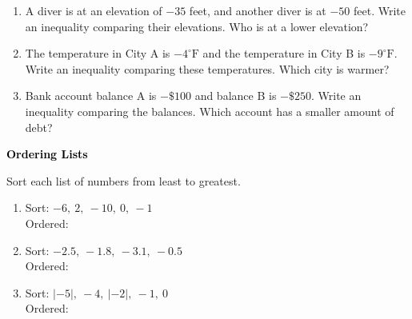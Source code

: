 \documentclass[12pt, letterpaper, fleqn]{article}
\newcommand{\blanklong}{\underline{\hspace{6.5cm}}}
\begin{document}
\begin{enumerate}[itemsep=2.2cm, leftmargin=0.6cm]

\item A diver is at an elevation of $-35$ feet, and another diver is at $-50$ feet. Write an inequality comparing their elevations. Who is at a lower elevation?

\vspace{2cm}

\item The temperature in City A is $-4^\circ\text{F}$ and the temperature in City B is $-9^\circ\text{F}$. Write an inequality comparing these temperatures. Which city is warmer?

\vspace{2cm}

\item Bank account balance A is $-\$100$ and balance B is $-\$250$. Write an inequality comparing the balances. Which account has a smaller amount of debt?

\vspace{2cm}

\end{enumerate}

\newpage

\begin{tcolorbox}[colback=black!10]
\large\textcolor{black}{\textbf{Ordering Lists}}
\end{tcolorbox}

\noindent
Sort each list of numbers from least to greatest.

\vspace{3mm}

\begin{enumerate}[itemsep=2.2cm, leftmargin=0.6cm]

\item Sort: $-6, \ 2, \ -10, \ 0, \ -1$ \\
Ordered: \blanklong

\vspace{2.2cm}

\item Sort: $-2.5, \ -1.8, \ -3.1, \ -0.5$ \\
Ordered: \blanklong

\vspace{2.2cm}

\item Sort: $|-5|, \ -4, \ |-2|, \ -1, \ 0$ \\
Ordered: \blanklong

\vspace{2.2cm}

\end{enumerate}
\end{document}

